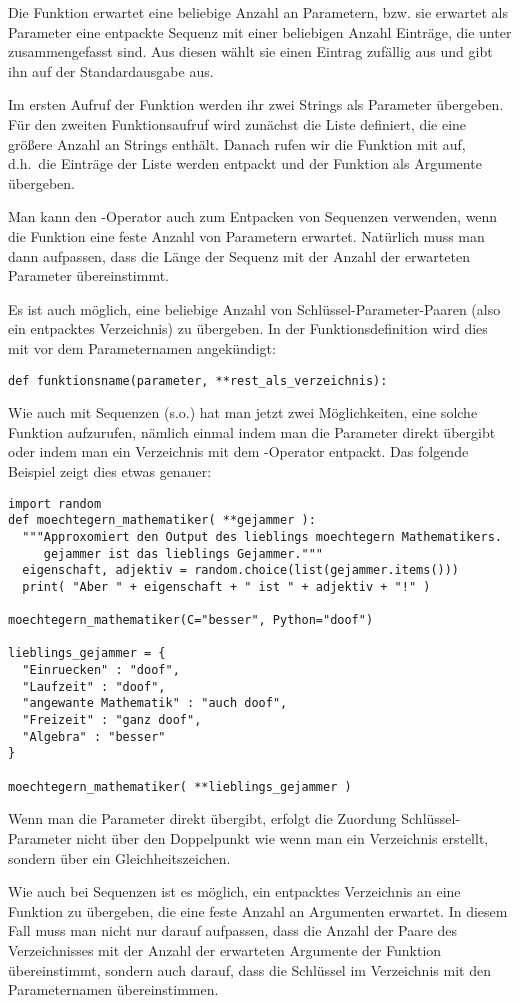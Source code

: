 Die Funktion  erwartet eine beliebige Anzahl an Parametern, bzw. sie erwartet als Parameter eine 
entpackte Sequenz mit einer beliebigen Anzahl Einträge, die unter  zusammengefasst sind. Aus diesen wählt sie einen 
Eintrag zufällig aus und gibt ihn auf der Standardausgabe aus.

Im ersten Aufruf der Funktion werden ihr zwei Strings als Parameter übergeben. Für den zweiten Funktionsaufruf wird zunächst die 
Liste  definiert, die eine größere Anzahl an Strings enthält. Danach rufen wir die Funktion mit 
 auf, d.h.\ die Einträge der Liste werden entpackt und der Funktion als Argumente übergeben.

Man kann den \lpy{*}-Operator auch zum Entpacken von Sequenzen verwenden, wenn die Funktion eine feste Anzahl von Parametern 
erwartet. Natürlich muss man dann aufpassen, dass die Länge der Sequenz mit der Anzahl der erwarteten Parameter übereinstimmt.

Es ist auch möglich, eine beliebige Anzahl von Schlüssel-Parameter-Paaren (also ein entpacktes Verzeichnis) zu übergeben. In der 
Funktionsdefinition wird dies mit \lpy{**} vor dem Parameternamen angekündigt:

\begin{lstlisting}
def funktionsname(parameter, **rest_als_verzeichnis):
\end{lstlisting}

Wie auch mit Sequenzen (s.o.) hat man jetzt zwei Möglichkeiten, eine solche Funktion aufzurufen, nämlich einmal indem man die 
Parameter direkt übergibt oder indem man ein Verzeichnis mit dem \lpy{**}-Operator entpackt. Das folgende Beispiel 
zeigt dies etwas genauer:

\begin{lstlisting}
import random
def moechtegern_mathematiker( **gejammer ):
  """Approxomiert den Output des lieblings moechtegern Mathematikers.
     gejammer ist das lieblings Gejammer."""
  eigenschaft, adjektiv = random.choice(list(gejammer.items()))
  print( "Aber " + eigenschaft + " ist " + adjektiv + "!" )

moechtegern_mathematiker(C="besser", Python="doof")

lieblings_gejammer = {
  "Einruecken" : "doof",
  "Laufzeit" : "doof",
  "angewante Mathematik" : "auch doof",
  "Freizeit" : "ganz doof",
  "Algebra" : "besser"
}

moechtegern_mathematiker( **lieblings_gejammer )
\end{lstlisting}

Wenn man die Parameter direkt übergibt, erfolgt die Zuordung Schlüssel-Parameter nicht über den Doppelpunkt wie wenn man ein 
Verzeichnis erstellt, sondern über ein Gleichheitszeichen.

Wie auch bei Sequenzen ist es möglich, ein entpacktes Verzeichnis an eine Funktion zu übergeben, die eine feste Anzahl an 
Argumenten erwartet. In diesem Fall muss man nicht nur darauf aufpassen, dass die Anzahl der Paare des Verzeichnisses mit 
der Anzahl der erwarteten Argumente der Funktion übereinstimmt, sondern auch darauf, dass die Schlüssel im Verzeichnis mit 
den Parameternamen übereinstimmen.
